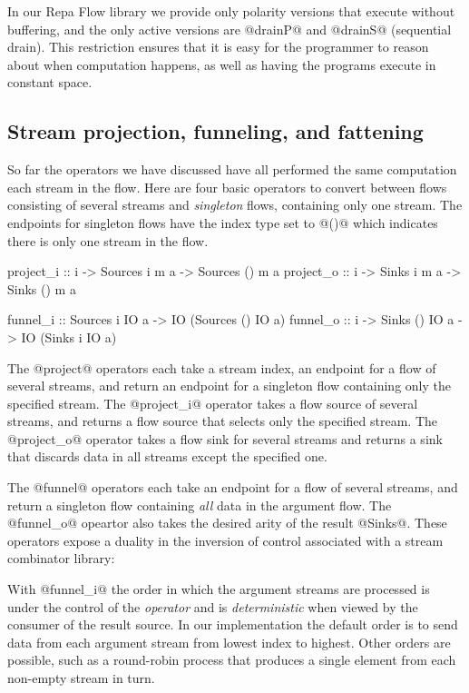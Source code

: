 In our Repa Flow library we provide only polarity versions that execute without buffering, and the only active versions are @drainP@ and @drainS@ (sequential drain). This restriction ensures that it is easy for the programmer to reason about when computation happens, as well as having the programs execute in constant space.


\subsection{Stream projection, funneling, and fattening}
So far the operators we have discussed have all performed the same computation each stream in the flow. Here are four basic operators to convert between flows consisting of several streams and \emph{singleton} flows, containing only one stream. The endpoints for singleton flows have the index type set to @()@ which indicates there is only one stream in the flow.
\begin{code}
project_i :: i -> Sources i m a -> Sources () m a
project_o :: i -> Sinks   i m a -> Sinks   () m a

funnel_i :: Sources i IO a ->  IO (Sources () IO a)
funnel_o :: i -> Sinks () IO a -> IO (Sinks i IO a)
\end{code}

The @project@ operators each take a stream index, an endpoint for a flow of several streams, and return an endpoint for a singleton flow containing only the specified stream. The @project_i@ operator takes a flow source of several streams, and returns a flow source that selects only the specified stream. The @project_o@ operator takes a flow sink for several streams and returns a sink that discards data in all streams except the specified one.

The @funnel@ operators each take an endpoint for a flow of several streams, and return a singleton flow containing \emph{all} data in the argument flow. The @funnel_o@ opeartor also takes the desired arity of the result @Sinks@. These operators expose a duality in the inversion of control associated with a stream combinator library:

With @funnel_i@ the order in which the argument streams are processed is under the control of the \emph{operator} and is \emph{deterministic} when viewed by the consumer of the result source. In our implementation the default order is to send data from each argument stream from lowest index to highest. Other orders are possible, such as a round-robin process that produces a single element from each non-empty stream in turn. 

